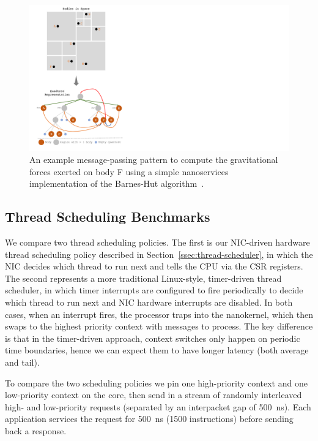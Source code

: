 \begin{figure}
 \includegraphics[width=0.9\linewidth]{./figures/barneshut-algo}
 \caption{An example message-passing pattern to compute the gravitational forces exerted on body F using a simple nanoservices implementation of the Barnes-Hut algorithm~\cite{barnes-hut}.}
 \label{fig:barnes-hut}
\end{figure}

\subsection{Thread Scheduling Benchmarks}
We compare two thread scheduling policies. The first is our NIC-driven hardware thread scheduling policy described in Section~\ref{ssec:thread-scheduler}, in which the NIC decides which thread to run next and tells the CPU via the CSR registers. The second represents a more traditional Linux-style, timer-driven thread scheduler, in which timer interrupts are configured to fire periodically to decide which thread to run next and NIC hardware interrupts are disabled.
In both cases, when an interrupt fires, the processor traps into the nanokernel, which then swaps to the highest priority context with messages to process.
The key difference is that in the timer-driven approach, context switches only happen on periodic time boundaries, hence we can expect them to have longer latency (both average and tail).

To compare the two scheduling policies we pin one high-priority context and one low-priority context on the core, then send in a stream of randomly interleaved high- and low-priority requests (separated by an interpacket gap of \SI{500}{ns}).
Each application services the request for \SI{500}{ns} (1500 instructions) before sending back a response. 

